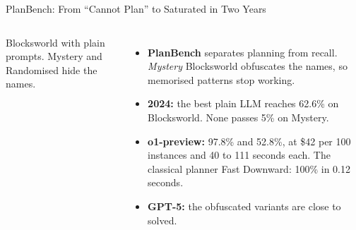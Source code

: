 \begin{frame}{PlanBench: From ``Cannot Plan'' to Saturated in Two Years}
\begin{columns}[T,onlytextwidth]
        {\scriptsize Blocksworld with plain prompts. Mystery and Randomised hide the names.}
        \begin{itemize}\itemsep0.45em
            \item \textbf{PlanBench} separates planning from recall. \emph{Mystery} Blocksworld obfuscates the names, so memorised patterns stop working.
            \item \textbf{2024:} the best plain LLM reaches 62.6\% on Blocksworld. None passes 5\% on Mystery.
            \item \textbf{o1-preview:} 97.8\% and 52.8\%, at \$42 per 100 instances and 40 to 111 seconds each. The classical planner Fast Downward: 100\% in 0.12 seconds.
            \item \textbf{GPT-5:} the obfuscated variants are close to solved.
        \end{itemize}
    \end{columns}
    \vspace{0.1em}
\end{frame}

